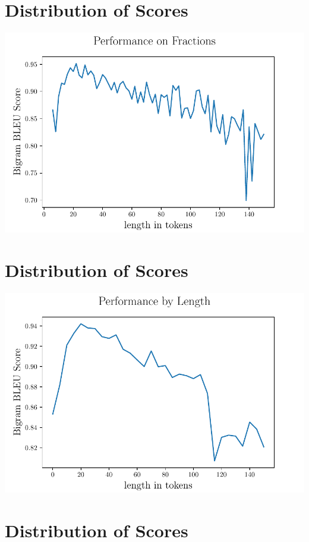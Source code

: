 \hypertarget{distribution-of-scores-1}{%
\section{Distribution of Scores}\label{distribution-of-scores-1}}

\includegraphics{assets/scorebyfrac.pdf}

\hypertarget{distribution-of-scores-2}{%
\section{Distribution of Scores}\label{distribution-of-scores-2}}

\includegraphics{assets/scorebylen.pdf}

\hypertarget{distribution-of-scores-3}{%
\section{Distribution of Scores}\label{distribution-of-scores-3}}

